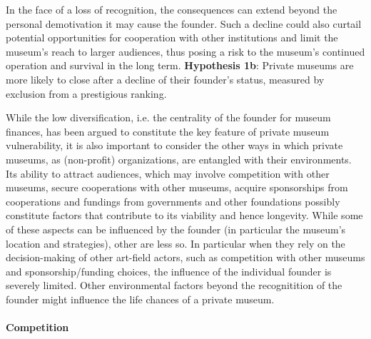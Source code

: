 \documentclass[12pt]{article}
\begin{document}
In the face of a loss of recognition, the consequences can extend beyond the personal demotivation it may cause the founder.
Such a decline could also curtail potential opportunities for cooperation with other institutions and limit the museum's reach to larger audiences, thus posing a risk to the museum's continued operation and survival in the long term.
\textbf{Hypothesis 1b}: Private museums are more likely to close after a decline of their founder's status, measured by exclusion from a prestigious ranking.



While the low diversification, i.e. the centrality of the founder for museum finances, has been argued to constitute the key feature of private museum vulnerability, it is also important to consider the other ways in which private museums, as (non-profit) organizations, are entangled with their environments.
Its ability to attract audiences, which may involve competition with other museums, secure cooperations with other museums, acquire sponsorships from cooperations and fundings from governments and other foundations possibly constitute factors that contribute to its viability and hence longevity.
While some of these aspects can be influenced by the founder (in particular the museum's location and strategies), other are less so.
In particular when they rely on the decision-making of other art-field actors, such as competition with other museums and sponsorship/funding choices, the influence of the individual founder is severely limited.
Other environmental factors beyond the recognitition of the founder might influence the life chances of a private museum.
\paragraph*{Competition}
\end{document}
